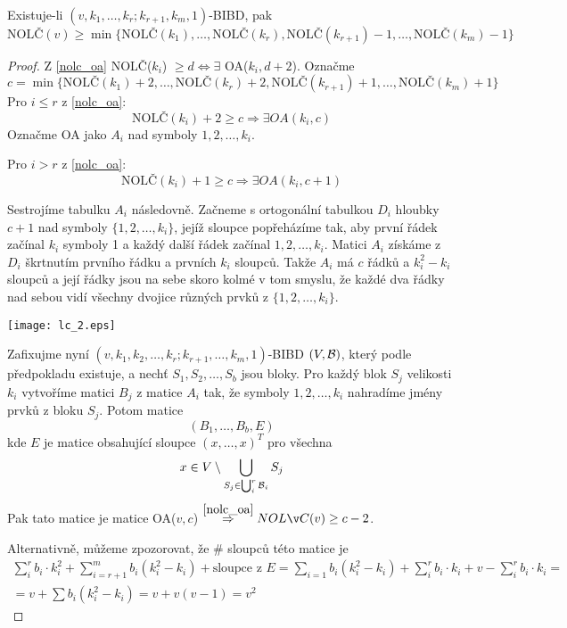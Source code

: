 \begin{theorem}\label{nolc_lower_2}~\\
    Existuje-li $(v,k_1,\ldots,k_r;k_{r+1},k_m, 1)$-BIBD, pak
    \[ \text{NOLČ}(v) \geq \min\{\text{NOLČ}(k_1), \ldots, \text{NOLČ}(k_r), \text{NOLČ}(k_{r+1}) - 1, \ldots, \text{NOLČ}(k_m) - 1\} \]
\end{theorem}
\begin{proof}
	Z \cref{nolc_oa} NOLČ($k_i$) $\geq d \iff \exists$ OA($k_i, d + 2$).
	Označme
	\[ c = \min\{\text{NOLČ}(k_1) + 2, \ldots, \text{NOLČ}(k_r) + 2, \text{NOLČ}(k_{r+1}) + 1, \ldots, \text{NOLČ}(k_m) + 1\} \]
	Pro $i \leq r$ z \cref{nolc_oa}:
	\[ \text{NOLČ}(k_i) + 2 \geq c \Rightarrow \exists OA(k_i, c) \]
	Označme OA jako $A_i$ nad symboly $1, 2, \ldots, k_i$.

	Pro $i > r$ z \cref{nolc_oa}:
	\[ \text{NOLČ}(k_i) + 1 \geq c \Rightarrow \exists OA(k_i, c + 1) \]

	Sestrojíme tabulku $A_i$ následovně.
	Začneme s ortogonální tabulkou $D_i$ hloubky $c + 1$ nad symboly $\{ 1, 2, \ldots, k_i \}$, jejíž sloupce popřeházíme tak, aby první řádek začínal $k_i$ symboly 1 a každý další řádek začínal $1, 2, \ldots, k_i$.
	Matici $A_i$ získáme z $D_i$ škrtnutím prvního řádku a prvních $k_i$ sloupců.
	Takže $A_i$ má $c$ řádků a $k_i^2 - k_i$ sloupců a její řádky jsou na sebe skoro kolmé v tom smyslu, že každé dva řádky nad sebou vidí všechny dvojice různých prvků z $\{1, 2, \ldots, k_i \}$.

	\texttt{[image: lc\_2.eps]}

	Zafixujme nyní $(v, k_1, k_2, \ldots, k_r; k_{r + 1}, \ldots, k_m, 1)$-BIBD $(V, \operatorname{\mathcal{B}})$, který podle předpokladu existuje, a nechť $S_1, S_2, \ldots, S_b$ jsou bloky.
	Pro každý blok $S_j$ velikosti $k_i$ vytvoříme matici $B_j$ z matice $A_i$ tak, že symboly $1, 2, \ldots, k_i$ nahradíme jmény prvků z bloku $S_j$.
	Potom matice
	\[ (B_1, \ldots, B_b, E) \]
	kde $E$ je matice obsahující sloupce $(x, \ldots, x)^T$ pro všechna
	\[ x \in V \setminus \bigcup_{S_j \in \bigcup_i^r \operatorname{\mathcal{B}}_i} S_j \]
	Pak tato matice je matice OA($v, c$) $\stackrel{\cref{nolc_oa}}{\Rightarrow} NOLČ(v) \geq c - 2$.

	Alternativně, můžeme zpozorovat, že \# sloupců této matice je
	\begin{gather*}
		\sum_i^r b_i \cdot k_i^2 + \sum_{i = r + 1}^{m} b_i (k_i^2 - k_i) + \text{sloupce z }E =  \sum_{i = 1} b_i (k_i^2 - k_i) + \sum_i^r b_i \cdot k_i + v - \sum_i^r b_i \cdot k_i =\\
		= v + \sum b_i (k_i^2 - k_i) = v + v(v - 1) = v^2
	\end{gather*}

\end{proof}


